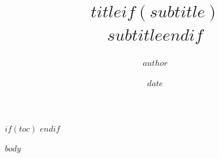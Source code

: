 \documentclass[$if(fontsize)$$fontsize$,$endif$$if(lang)$$babel-lang$,$endif$$if(papersize)$$papersize$paper,$endif$]{ctexbook}
\title{$title$$if(subtitle)$\\\large{$subtitle$}$endif$}
\author{$author$}
\date{$date$}
\begin{document}
\maketitle
$if(toc)$
\tableofcontents
$endif$

$body$
\end{document}
